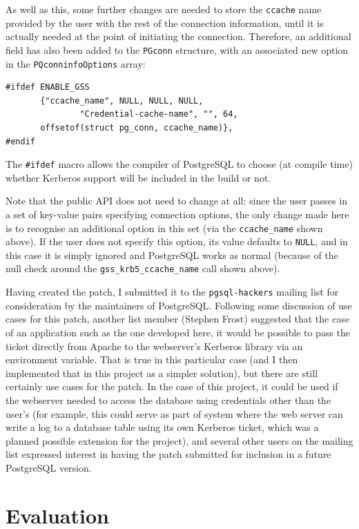 \documentclass[12pt]{report}
\begin{document}
As well as this, some further changes are needed to store the \texttt{ccache} name provided by the user with the rest of the connection information, until it is actually needed at the point of initiating the connection. Therefore, an additional field has also been added to the \texttt{PGconn} structure, with an associated new option in the \texttt{PQconninfoOptions} array:

\begin{verbatim}
#ifdef ENABLE_GSS
       {"ccache_name", NULL, NULL, NULL,
               "Credential-cache-name", "", 64,
       offsetof(struct pg_conn, ccache_name)},
#endif
\end{verbatim}

The \verb+#ifdef+ macro allows the compiler of PostgreSQL to choose (at compile time) whether Kerberos support will be included in the build or not.

Note that the public API does not need to change at all: since the user passes in a set of key-value pairs specifying connection options, the only change made here is to recognise an additional option in this set (via the \verb+ccache_name+ shown above). If the user does not specify this option, its value defaults to \texttt{NULL}, and in this case it is simply ignored and PostgreSQL works as normal (because of the null check around the \verb+gss_krb5_ccache_name+ call shown above).

Having created the patch, I submitted it to the \texttt{pgsql-hackers} mailing list for consideration by the maintainers of PostgreSQL\cite{postgres-patch-list}. Following some discussion of use cases for this patch, another list member (Stephen Frost) suggested that the case of an application such as the one developed here, it would be possible to pass the ticket directly from Apache to the webserver's Kerberos library via an environment variable. That is true in this particular case (and I then implemented that in this project as a simpler solution), but there are still certainly use cases for the patch. In the case of this project, it could be used if the webserver needed to access the database using credentials other than the user's (for example, this could serve as part of system where the web server can write a log to a database table using its own Kerberos ticket, which was a planned possible extension for the project), and several other users on the mailing list expressed interest in having the patch submitted for inclusion in a future PostgreSQL version.


\chapter{Evaluation}
\end{document}
